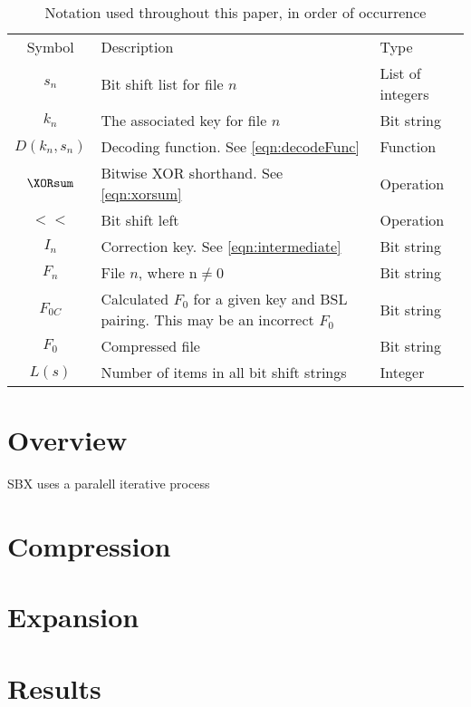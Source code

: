 \documentclass{cup-ino}
\begin{document}
\begin{table}[ht]
    \centering
    \begin{tabular}{c >{\raggedleft\arraybackslash}p{5.5cm} >{\raggedleft\arraybackslash}p{3cm}}
        \hline
        Symbol & Description & Type \\
        \Xhline{3\arrayrulewidth}
        $s_n$ & Bit shift list for file $n$ & List of integers \\
        $k_n$ & The associated key for file $n$ & Bit string \\
        $D(k_n,s_n)$ & Decoding function. See \cref{eqn:decodeFunc} & Function \\
        $\XORsum$ & Bitwise XOR shorthand. See \cref{eqn:xorsum} & Operation \\
        $<<$ & Bit shift left & Operation \\
        $I_n$ & Correction key. See \cref{eqn:intermediate} & Bit string \\
        $F_n$ & File $n$, where n$\neq0$ & Bit string \\
        $F_{0C}$ & Calculated $F_0$ for a given key and BSL pairing. This may be an incorrect $F_0$ & Bit
        string \\
        $F_0$ & Compressed file & Bit string \\
        $L(s)$ & Number of items in all bit shift strings & Integer\\
        \hline
    \end{tabular}
    \caption{Notation used throughout this paper, in order of occurrence}
    \label{tab:notationTable}
\end{table}

\section{Overview}

SBX uses a paralell iterative process

\section{Compression}

\section{Expansion}

\section{Results}
\end{document}
